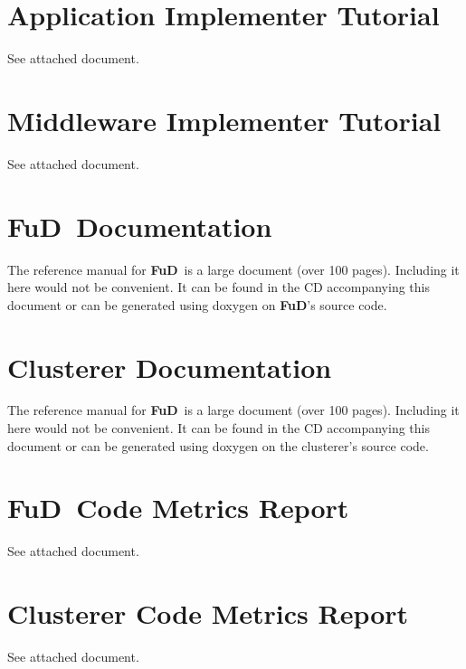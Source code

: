 \documentclass[a4paper,12pt,english]{report}
\newcommand{\fud}{\textbf{FuD}}
\begin{document}
\chapter{Application Implementer Tutorial}\label{apptutorial}

See attached document.

\chapter{Middleware Implementer Tutorial}

See attached document.

\chapter{\fud \ Documentation}

The reference manual for \fud \ is a large document (over 100 pages). Including it here would not be convenient. It can be found in the CD accompanying this document or can be generated using doxygen on \fud 's source code.

\chapter{Clusterer Documentation}

The reference manual for \fud \ is a large document (over 100 pages). Including it here would not be convenient. It can be found in the CD accompanying this document or can be generated using doxygen on the clusterer's source code.

\chapter{\fud \ Code Metrics Report}\label{fudmetricsrep}

See attached document.

\chapter{Clusterer Code Metrics Report}\label{clusterermetricsrep}

See attached document.
\end{document}
